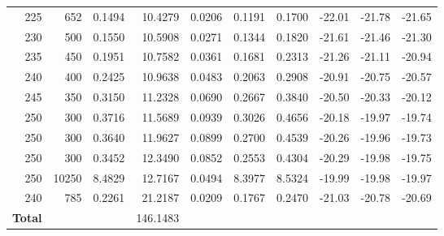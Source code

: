{\begin{landscape}
\begin{longtable}{r r r r r r r r r r}
225 & 652 & 0.1494 & 10.4279 & 0.0206 & 0.1191 & 0.1700 & -22.01 & -21.78 & -21.65 \\
230 & 500 & 0.1550 & 10.5908 & 0.0271 & 0.1344 & 0.1820 & -21.61 & -21.46 & -21.30 \\
235 & 450 & 0.1951 & 10.7582 & 0.0361 & 0.1681 & 0.2313 & -21.26 & -21.11 & -20.94 \\
240 & 400 & 0.2425 & 10.9638 & 0.0483 & 0.2063 & 0.2908 & -20.91 & -20.75 & -20.57 \\
245 & 350 & 0.3150 & 11.2328 & 0.0690 & 0.2667 & 0.3840 & -20.50 & -20.33 & -20.12 \\
250 & 300 & 0.3716 & 11.5689 & 0.0939 & 0.3026 & 0.4656 & -20.18 & -19.97 & -19.74 \\
250 & 300 & 0.3640 & 11.9627 & 0.0899 & 0.2700 & 0.4539 & -20.26 & -19.96 & -19.73 \\
250 & 300 & 0.3452 & 12.3490 & 0.0852 & 0.2553 & 0.4304 & -20.29 & -19.98 & -19.75 \\
250 & 10250 & 8.4829 & 12.7167 & 0.0494 & 8.3977 & 8.5324 & -19.99 & -19.98 & -19.97 \\
240 & 785 & 0.2261 & 21.2187 & 0.0209 & 0.1767 & 0.2470 & -21.03 & -20.78 & -20.69 \\
\midrule
\textbf{Total} &  &  & 146.1483 &  &  &  &  &  &  \\
\end{longtable}
\end{landscape}
}

